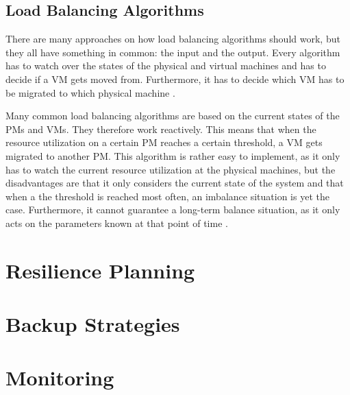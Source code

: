 \subsection{Load Balancing Algorithms}
There are many approaches on how load balancing algorithms should work, but they all have something in common: the input and the output. Every algorithm has to watch over the states of the physical and virtual machines and has to decide if a VM gets moved from. Furthermore, it has to decide which VM has to be migrated to which physical machine \cite{Chen_2014}.

Many common load balancing algorithms are based on the current states of the PMs and VMs. They therefore work reactively. This means that when the resource utilization on a certain PM reaches a certain threshold, a VM gets migrated to another PM. This algorithm is rather easy to implement, as it only has to watch the current resource utilization at the physical machines, but the disadvantages are that it only considers the current state of the system and that when a the threshold is reached most often, an imbalance situation is yet the case. Furthermore, it cannot guarantee a long-term balance situation, as it only acts on the parameters known at that point of time \cite{Chen_2014,Arzuaga_2010}.

\section{Resilience Planning}

\section{Backup Strategies}

\section{Monitoring}